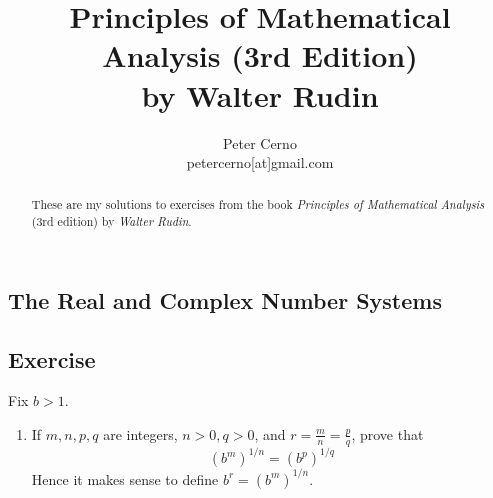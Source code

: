 \documentclass[10pt,varwidth=6in,margin=0.2in,preview]{standalone}
\title{
    Principles of Mathematical Analysis (3rd Edition)\\
    by Walter Rudin
}
\author{
    Peter Cerno\\
    \small petercerno[at]gmail.com
}
\begin{document}
\begin{flushleft}

\pagecolor{pagecolor}


\date{}
\maketitle

\begin{abstract}
These are my solutions to exercises from the book \emph{Principles of Mathematical Analysis} (3rd edition) by \emph{Walter Rudin}.
\end{abstract}



\setcounter{section}{0}
\section{The Real and Complex Number Systems}

\setcounter{subsection}{5}
\subsection{Exercise}

Fix $b > 1$.



\begin{enumerate}[label=(\alph*)]

\item
If $m, n, p, q$ are integers, $n > 0, q > 0$, and $r = \frac{m}{n} = \frac{p}{q}$, prove that
\[ (b^m)^{1/n} = (b^p)^{1/q} \]
Hence it makes sense to define $b^r = (b^m)^{1/n}$.




\end{enumerate}
\end{flushleft}
\end{document}

